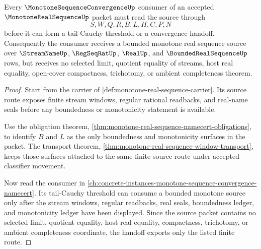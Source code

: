 \begin{theorem}
\label{thm:monotone-real-sequence-convergence-handoff}
Every $\MonotoneSequenceConvergenceUp$ consumer of an accepted $\MonotoneRealSequenceUp$ packet must read the source through
$$
S,W,Q,R,B,L,H,C,P,N
$$
before it can form a tail-Cauchy threshold or a convergence handoff. Consequently the consumer receives a bounded monotone real sequence source over $\StreamNameUp$, $\RegSeqRatUp$, $\RealUp$, and $\BoundedRealSequenceUp$ rows, but receives no selected limit, quotient equality of streams, host real equality, open-cover compactness, trichotomy, or ambient completeness theorem.
\end{theorem}
\begin{proof}
Start from the carrier of \autoref{def:monotone-real-sequence-carrier}. Its source route exposes finite stream windows, regular rational readbacks, and real-name seals before any boundedness or monotonicity statement is available.

Use the obligation theorem, \autoref{thm:monotone-real-sequence-namecert-obligations}, to identify $B$ and $L$ as the only boundedness and monotonicity surfaces in the packet. The transport theorem, \autoref{thm:monotone-real-sequence-window-transport}, keeps those surfaces attached to the same finite source route under accepted classifier movement.

Now read the consumer in \autoref{ch:concrete-instances-monotone-sequence-convergence-namecert}. Its tail-Cauchy threshold can consume a bounded monotone source only after the stream windows, regular readbacks, real seals, boundedness ledger, and monotonicity ledger have been displayed. Since the source packet contains no selected limit, quotient equality, host real equality, compactness, trichotomy, or ambient completeness coordinate, the handoff exports only the listed finite route.
\end{proof}


